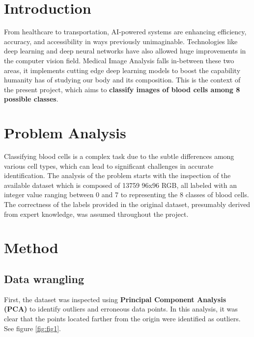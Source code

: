 \documentclass[10pt]{article}
\begin{document}
    \begin{multicols}{2}
    
    \section{Introduction}
        
        From healthcare to transportation, AI-powered systems are enhancing efficiency, accuracy, and accessibility in ways previously unimaginable. Technologies like deep learning and deep neural networks have also allowed huge improvements in the computer vision field.
        Medical Image Analysis falls in-between these two areas, it implements cutting edge deep learning models to boost the capability humanity has of studying our body and its composition. This is the context of the present project, which aims to \textbf{classify images of blood cells among 8 possible classes}. 

        
    \section{Problem Analysis}

        Classifying blood cells is a complex task due to the subtle differences among various cell types, which can lead to significant challenges in accurate identification. The analysis of the problem starts with the inspection of the available dataset which is composed of 13759 96x96 RGB, all labeled with an integer value ranging between 0 and 7 to representing the 8 classes of blood cells.
        The correctness of the labels provided in the original dataset, presumably derived from expert knowledge, was assumed throughout the project.

    
    \section{Method}
        \label{sec:method}
        
        \subsection{Data wrangling}
        \label{sec:wrangling}
        First, the dataset was inspected using \textbf{Principal Component Analysis (PCA)}  \cite{jolliffe2016principal} to identify outliers and erroneous data points. In this analysis, it was clear that the points located farther from the origin were identified as outliers. See figure \ref{fig:fig1}.       


\end{multicols}
\end{document}
